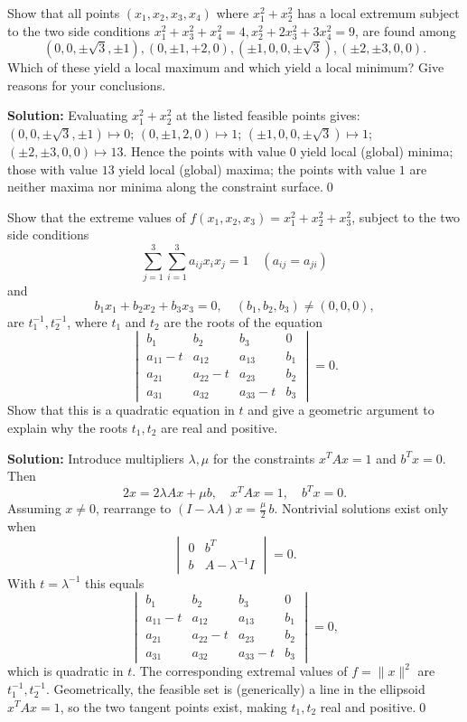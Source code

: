 \begin{problembox}
Show that all points \((x_1, x_2, x_3, x_4)\) where \(x_1^2 + x_2^2\) has a local extremum subject to the two side conditions \(x_1^2 + x_3^2 + x_4^2 = 4, x_2^2 + 2x_3^2 + 3x_4^2 = 9\), are found among 
\[ (0, 0, \pm \sqrt{3}, \pm 1), (0, \pm 1, +2, 0), (\pm 1, 0, 0, \pm \sqrt{3}), (\pm 2, \pm 3, 0, 0). \]
Which of these yield a local maximum and which yield a local minimum? Give reasons for your conclusions.
\end{problembox}

\noindent\textbf{Solution:}
Evaluating $x_1^2+x_2^2$ at the listed feasible points gives: $(0,0,\pm\sqrt3,\pm1)\mapsto 0$; $(0,\pm1,2,0)\mapsto 1$; $(\pm1,0,0,\pm\sqrt3)\mapsto 1$; $(\pm2,\pm3,0,0)\mapsto 13$. Hence the points with value $0$ yield local (global) minima; those with value $13$ yield local (global) maxima; the points with value $1$ are neither maxima nor minima along the constraint surface.\qed


\begin{problembox}
Show that the extreme values of \(f(x_1, x_2, x_3) = x_1^2 + x_2^2 + x_3^2\), subject to the two side conditions
\[ \sum_{j=1}^3 \sum_{i=1}^3 a_{ij} x_i x_j = 1 \quad (a_{ij} = a_{ji}) \]
and
\[ b_1 x_1 + b_2 x_2 + b_3 x_3 = 0, \quad (b_1, b_2, b_3) \neq (0, 0, 0), \]
are \(t_1^{-1}, t_2^{-1}\), where \(t_1\) and \(t_2\) are the roots of the equation
\[\begin{vmatrix}
b_1 & b_2 & b_3 & 0 \\
a_{11} - t & a_{12} & a_{13} & b_1 \\
a_{21} & a_{22} - t & a_{23} & b_2 \\
a_{31} & a_{32} & a_{33} - t & b_3
\end{vmatrix} = 0.\]
Show that this is a quadratic equation in \(t\) and give a geometric argument to explain why the roots \(t_1, t_2\) are real and positive.
\end{problembox}

\noindent\textbf{Solution:}
Introduce multipliers $\lambda,\mu$ for the constraints $x^{\!T}Ax=1$ and $b^{\!T}x=0$. Then
\[2x=2\lambda Ax+\mu b,\quad x^{\!T}Ax=1,\quad b^{\!T}x=0.
\]
Assuming $x\neq 0$, rearrange to $(I-\lambda A)x=\tfrac{\mu}{2}\,b$. Nontrivial solutions exist only when
\[\begin{vmatrix}
0 & b^{\!T} \\
b & A-\lambda^{-1}I
\end{vmatrix}=0.
\]
With $t=\lambda^{-1}$ this equals
\[\begin{vmatrix}
b_1 & b_2 & b_3 & 0 \\
a_{11} - t & a_{12} & a_{13} & b_1 \\
a_{21} & a_{22} - t & a_{23} & b_2 \\
a_{31} & a_{32} & a_{33} - t & b_3
\end{vmatrix}=0,
\]
which is quadratic in $t$. The corresponding extremal values of $f=\|x\|^2$ are $t_1^{-1}, t_2^{-1}$. Geometrically, the feasible set is (generically) a line in the ellipsoid $x^{\!T}Ax=1$, so the two tangent points exist, making $t_1,t_2$ real and positive.\qed


